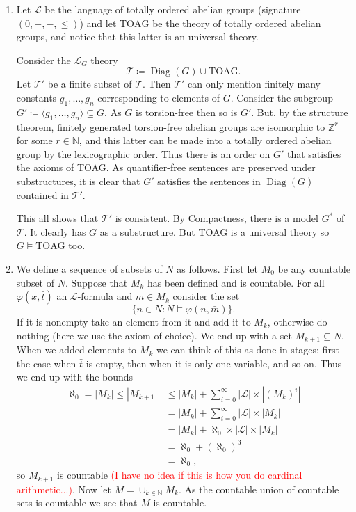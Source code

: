 \documentclass{article}
\DeclareMathOperator{\Diag}{Diag}
\begin{document}
\begin{enumerate}[leftmargin=*]
		\item Let $\mathcal{L}$ be the language of totally ordered abelian groups (signature $(0,+,-,\leq)$)  and let $\text{TOAG}$ be the theory of totally ordered abelian groups, and notice that this latter is an universal theory. 
		
		Consider the $\mathcal{L}_G$ theory 
		\[
			\mathcal{T} \coloneqq \Diag(G) \cup \text{TOAG}.
		\]
		Let $\mathcal{T}'$ be a finite subset of $\mathcal{T}$. Then $\mathcal{T}'$ can only mention finitely many constants $g_1,\ldots,g_n$ corresponding to elements of $G$. Consider the subgroup $G'\coloneqq \langle g_1,\ldots,g_n\rangle \subseteq G$. As $G$ is torsion-free then so is $G'$. But, by the structure theorem, finitely generated torsion-free abelian groups are isomorphic to $\mathbb{Z}^{r}$ for some $r\in \mathbb{N}$, and this latter can be made into a totally ordered abelian group by the lexicographic order. Thus there is an order on $G'$ that satisfies the axioms of TOAG. As quantifier-free sentences are preserved under substructures, it is clear that $G'$ satisfies the sentences in $\Diag(G)$ contained in $\mathcal{T}'$. 
		
		This all shows that $\mathcal{T}'$ is consistent. By Compactness, there is a model $G^*$ of $\mathcal{T}$. It clearly has $G$ as a substructure. But TOAG is a universal theory so $G\models \text{TOAG}$ too.
	
		\item We define a sequence of subsets of $N$ as follows. First let $M_0$ be any countable subset of $N$. Suppose that $M_k$ has been defined and is countable. For all $\varphi(x,\bar{t})$ an $\mathcal{L}$-formula and $\bar{m}\in M_k$ consider the set
		\[
			\{n\in N \colon N \models \varphi(n,\bar{m})\}.
		\] 
		If it is nonempty take an element from it and add it to $M_k$, otherwise do nothing (here we use the axiom of choice). We end up with a set $M_{k+1} \subseteq N$. When we added elements to $M_k$ we can think of this as done in stages: first the case when $\bar{t}$ is empty, then when it is only one variable, and so on. Thus we end up with the bounds
		\begin{align*}
			\aleph_0 = |M_k| \leq |M_{k+1}| &\leq |M_k|  + \sum_{i = 0}^{\infty}|\mathcal{L}|\times |(M_k)^i|\\
			&= |M_k| + \sum_{i=0}^{\infty} |\mathcal{L}| \times |M_k|\\
			&= |M_k| + \aleph_0\times |\mathcal{L}|\times |M_k|\\
			&= \aleph_0 + (\aleph_0)^3\\
			&= \aleph_0,
		\end{align*}
		so $M_{k+1}$ is countable \textcolor{red}{(I have no idea if this is how you do cardinal arithmetic...)}. Now let $M = \cup_{k\in \mathbb{N}} M_k$. As the countable union of countable sets is countable we see that $M$ is countable.
		

\end{enumerate}
\end{document}
